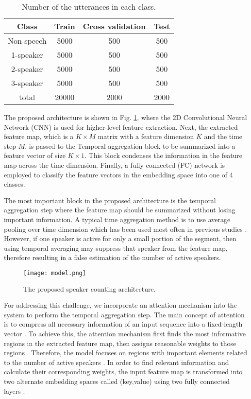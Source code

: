 \documentclass[a4paper]{article}
\begin{document}
\begin{table}[b]
\centering

 \begin{tabular}{||c c c c||}
 \hline
 Class & Train & Cross validation & Test \\ [0.5ex] 
 \hline\hline
 Non-speech & 5000 & 500 & 500 \\ 
 1-speaker & 5000 & 500 & 500 \\
 2-speaker & 5000 & 500 & 500 \\
 3-speaker & 5000 & 500 & 500 \\
 \hline
 total & 20000 & 2000 & 2000 \\ 
 \hline
 \end{tabular}
 
 \caption{Number of the utterances in each class.}
\label{tab:data}
\end{table}

The proposed architecture is shown in Fig. \ref{fig:model}, where the 2D Convolutional Neural Network (CNN) is used for higher-level feature extraction. Next, the extracted feature map, which is a $K\times M$ matrix with a feature dimension  $K$  and the time step $M$, is passed  to the  Temporal aggregation block to be summarized into a feature vector of size $K\times 1$. This block condenses the information in the feature map across the time dimension. Finally, a fully connected (FC) network is employed to classify the feature vectors in the embedding space into one of 4 classes.

The most important block in the proposed architecture is the temporal aggregation step where the feature map should be summarized without losing important information. A typical time aggregation method is to use average pooling over time dimension which has been used most often in previous studies \cite{stoter2018countnet,andrei2019overlapped, wang2020speaker}. However, if one speaker is active for only a small portion of the segment, then using temporal averaging may suppress that speaker from the feature map, therefore resulting in a false estimation of the number of active speakers. 

\begin{figure}
\centering
\texttt{[image: model.png]}
\caption{The proposed speaker counting architecture. }
\label{fig:model}
\end{figure}

For addressing this challenge, we incorporate an attention mechanism into the system to perform the temporal aggregation step. The main concept of attention is to compress all necessary information of an input sequence into a fixed-length vector \cite{vaswani2017attention}. To achieve this, the attention mechanism first finds the most informative regions in the extracted feature map, then assigns reasonable weights to those regions \cite{bahdanau2014neural}. Therefore, the model focuses on regions with important elements related to the number of active speakers \cite{galassiattention}.  In order to find relevant information and calculate their corresponding weights, the input feature map is transformed into two alternate embedding spaces called (key,value) using two fully connected layers \cite{vaswani2017attention}:
\end{document}
